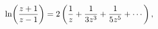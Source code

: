 \[\mathop{\ln\/}\nolimits\!\left(\frac{z+1}{z-1}\right)=2\left(\frac{1}{z}+\frac%
{1}{3z^{3}}+\frac{1}{5z^{5}}+\cdots\right),\]